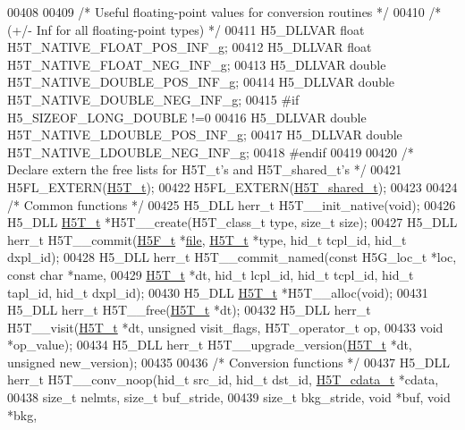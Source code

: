\begin{DoxyCode}
00408 
00409 \textcolor{comment}{/* Useful floating-point values for conversion routines */}
00410 \textcolor{comment}{/* (+/- Inf for all floating-point types) */}
00411 H5\_DLLVAR \textcolor{keywordtype}{float} H5T\_NATIVE\_FLOAT\_POS\_INF\_g;
00412 H5\_DLLVAR \textcolor{keywordtype}{float} H5T\_NATIVE\_FLOAT\_NEG\_INF\_g;
00413 H5\_DLLVAR \textcolor{keywordtype}{double} H5T\_NATIVE\_DOUBLE\_POS\_INF\_g;
00414 H5\_DLLVAR \textcolor{keywordtype}{double} H5T\_NATIVE\_DOUBLE\_NEG\_INF\_g;
00415 \textcolor{preprocessor}{#if H5\_SIZEOF\_LONG\_DOUBLE !=0}
00416 H5\_DLLVAR \textcolor{keywordtype}{double} H5T\_NATIVE\_LDOUBLE\_POS\_INF\_g;
00417 H5\_DLLVAR \textcolor{keywordtype}{double} H5T\_NATIVE\_LDOUBLE\_NEG\_INF\_g;
00418 \textcolor{preprocessor}{#endif}
00419 
00420 \textcolor{comment}{/* Declare extern the free lists for H5T\_t's and H5T\_shared\_t's */}
00421 H5FL\_EXTERN(\hyperlink{struct_h5_t__t}{H5T\_t});
00422 H5FL\_EXTERN(\hyperlink{struct_h5_t__shared__t}{H5T\_shared\_t});
00423 
00424 \textcolor{comment}{/* Common functions */}
00425 H5\_DLL herr\_t H5T\_\_init\_native(\textcolor{keywordtype}{void});
00426 H5\_DLL \hyperlink{struct_h5_t__t}{H5T\_t} *H5T\_\_create(H5T\_class\_t type, \textcolor{keywordtype}{size\_t} size);
00427 H5\_DLL herr\_t H5T\_\_commit(\hyperlink{struct_h5_f__t}{H5F\_t} *\hyperlink{structfile}{file}, \hyperlink{struct_h5_t__t}{H5T\_t} *type, hid\_t tcpl\_id, hid\_t dxpl\_id);
00428 H5\_DLL herr\_t H5T\_\_commit\_named(\textcolor{keyword}{const} H5G\_loc\_t *loc, \textcolor{keyword}{const} \textcolor{keywordtype}{char} *name,
00429     \hyperlink{struct_h5_t__t}{H5T\_t} *dt, hid\_t lcpl\_id, hid\_t tcpl\_id, hid\_t tapl\_id, hid\_t dxpl\_id);
00430 H5\_DLL \hyperlink{struct_h5_t__t}{H5T\_t} *H5T\_\_alloc(\textcolor{keywordtype}{void});
00431 H5\_DLL herr\_t H5T\_\_free(\hyperlink{struct_h5_t__t}{H5T\_t} *dt);
00432 H5\_DLL herr\_t H5T\_\_visit(\hyperlink{struct_h5_t__t}{H5T\_t} *dt, \textcolor{keywordtype}{unsigned} visit\_flags, H5T\_operator\_t op,
00433     \textcolor{keywordtype}{void} *op\_value);
00434 H5\_DLL herr\_t H5T\_\_upgrade\_version(\hyperlink{struct_h5_t__t}{H5T\_t} *dt, \textcolor{keywordtype}{unsigned} new\_version);
00435 
00436 \textcolor{comment}{/* Conversion functions */}
00437 H5\_DLL herr\_t H5T\_\_conv\_noop(hid\_t src\_id, hid\_t dst\_id, \hyperlink{struct_h5_t__cdata__t}{H5T\_cdata\_t} *cdata,
00438                 \textcolor{keywordtype}{size\_t} nelmts, \textcolor{keywordtype}{size\_t} buf\_stride,
00439                             \textcolor{keywordtype}{size\_t} bkg\_stride, \textcolor{keywordtype}{void} *buf, \textcolor{keywordtype}{void} *bkg,

\end{DoxyCode}
